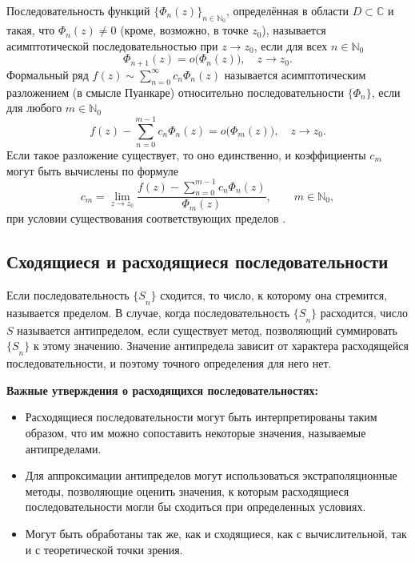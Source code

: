 \documentclass[14pt, a4paper]{extarticle}
\theoremstyle{definition}
\theoremstyle{remark}
\begin{document}
Последовательность функций \(\{\Phi_n(z)\}_{n\in\mathbb{N}_0}\), определённая в области \(D\subset\mathbb{C}\) и такая, что \(\Phi_n(z)\neq 0\) (кроме, возможно, в точке \(z_0\)), называется асимптотической последовательностью при \(z\to z_0\), если для всех \(n\in\mathbb{N}_0\)
\[
\Phi_{n+1}(z)=o\bigl(\Phi_n(z)\bigr),\quad z\to z_0.
\]
Формальный ряд \(f(z)\sim\sum_{n=0}^{\infty} c_n \Phi_n(z)\) называется асимптотическим разложением (в смысле Пуанкаре) относительно последовательности \(\{\Phi_n\}\), если для любого \(m\in\mathbb{N}_0\)
\[
f(z)-\sum_{n=0}^{m-1} c_n\Phi_n(z)=o\bigl(\Phi_m(z)\bigr),\quad z\to z_0.
\]
Если такое разложение существует, то оно единственно, и коэффициенты \(c_m\) могут быть вычислены по формуле
\[
c_m=\lim_{z\to z_0}\frac{f(z)-\sum_{n=0}^{m-1} c_n\Phi_n(z)}{\Phi_m(z)},\qquad m\in\mathbb{N}_0,
\]
при условии существования соответствующих пределов \cite{Weniger2003}.

\subsection*{Сходящиеся и расходящиеся последовательности}

Если последовательность \({\{ S}_{n}\}\) сходится, то число, к которому
она стремится, называется пределом. В случае, когда последовательность
\({\{ S}_{n}\}\) расходится, число \(S\) называется антипределом, если
существует метод, позволяющий суммировать \({\{ S}_{n}\}\) к этому
значению. Значение антипредела зависит от характера расходящейся
последовательности, и поэтому точного определения для него нет.




\textbf{Важные утверждения о расходящихся последовательностях:}

\begin{itemize}
\item
  Расходящиеся последовательности могут быть интерпретированы таким
  образом, что им можно сопоставить некоторые значения, называемые
  антипределами.
\item
  Для аппроксимации антипределов могут использоваться экстраполяционные
  методы, позволяющие оценить значения, к которым расходящиеся
  последовательности могли бы сходиться при определенных условиях.
\item
  Могут быть обработаны так же, как и сходящиеся, как с вычислительной,
  так и с теоретической точки зрения.
\end{itemize}
\end{document}
